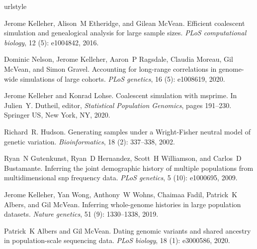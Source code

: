 \documentclass{article}
\begin{document}

\begin{thebibliography}{18}
\providecommand{\natexlab}[1]{#1}
\providecommand{\url}[1]{\texttt{#1}}
\expandafter\ifx\csname urlstyle\endcsname\relax
  \providecommand{\doi}[1]{doi: #1}\else
  \providecommand{\doi}{doi: \begingroup \urlstyle{rm}\Url}\fi

Jerome Kelleher, Alison~M Etheridge, and Gilean McVean.
\newblock Efficient coalescent simulation and genealogical analysis for large
  sample sizes.
\newblock \emph{PLoS computational biology}, 12 (5):
  e1004842, 2016.

Dominic Nelson, Jerome Kelleher, Aaron~P Ragsdale, Claudia Moreau, Gil McVean,
  and Simon Gravel.
\newblock Accounting for long-range correlations in genome-wide simulations of
  large cohorts.
\newblock \emph{PLoS genetics}, 16 (5): e1008619, 2020.

Jerome Kelleher and Konrad Lohse.
\newblock Coalescent simulation with msprime.
\newblock In Julien~Y. Dutheil, editor, \emph{Statistical Population Genomics},
  pages 191--230. Springer US, New York, NY, 2020.

Richard~R. Hudson.
\newblock Generating samples under a {Wright-Fisher} neutral model of genetic
  variation.
\newblock \emph{Bioinformatics}, 18 (2): 337--338, 2002.

Ryan~N Gutenkunst, Ryan~D Hernandez, Scott~H Williamson, and Carlos~D
  Bustamante.
\newblock Inferring the joint demographic history of multiple populations from
  multidimensional snp frequency data.
\newblock \emph{PLoS genetics}, 5 (10): e1000695, 2009.

Jerome Kelleher, Yan Wong, Anthony~W Wohns, Chaimaa Fadil, Patrick~K Albers,
  and Gil McVean.
\newblock Inferring whole-genome histories in large population datasets.
\newblock \emph{Nature genetics}, 51 (9): 1330--1338, 2019.

Patrick~K Albers and Gil McVean.
\newblock Dating genomic variants and shared ancestry in population-scale
  sequencing data.
\newblock \emph{PLoS biology}, 18 (1): e3000586, 2020.


\end{thebibliography}
\end{document}
